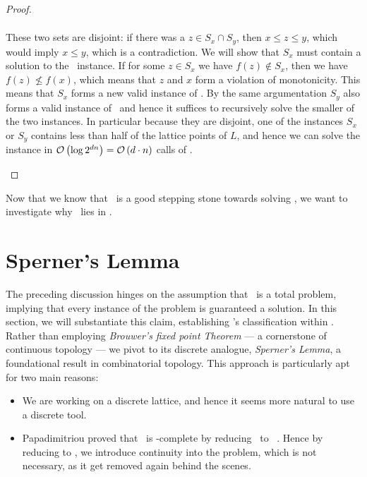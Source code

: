 \begin{proof}
\begin{case}{3}
\begin{align*}
        \end{align*}
        These two sets are disjoint: if there was a $z \in S_x \cap S_y$, then $x \leq z \leq y$, which would imply $x \leq y$, which is a contradiction. We will show that $S_x$ must contain a solution to the \Tarski\ instance.
        If for some $z \in S_x$ we have $f(z) \not\in S_x$, then we have $f(z) \not\leq f(x)$, which means that $z$ and $x$ form a violation of monotonicity. This means that $S_x$ forms a new valid instance of \Tarski. By the same argumentation $S_y$ also forms a valid instance of \Tarski\ and hence it suffices to recursively solve the smaller of the two instances. In particular because they are disjoint, one of the instances $S_x$ or $S_y$ contains less than half of the lattice points of $L$, and hence we can solve the instance in $\mathcal{O}\left(\log{2^{dn}}\right) = \mathcal{O}\left(d \cdot n\right)$ calls of \Tarskistar.
    \end{case}
\end{proof}

Now that we know that \Tarskistar\ is a good stepping stone towards solving \Tarski, we want to investigate why \Tarskistar\ lies in \PPAD.

\section{Sperner's Lemma}

The preceding discussion hinges on the assumption that \Tarskistar\ is a total problem, implying that every instance of the problem is guaranteed a solution. In this section, we will substantiate this claim, establishing \Tarskistar's classification within \TFNP. Rather than employing \textit{Brouwer's fixed point Theorem} --- a cornerstone of continuous topology --- we pivot to its discrete analogue, \textit{Sperner’s Lemma}, a foundational result in combinatorial topology. This approach is particularly apt for two main reasons:
\begin{itemize}
    \item We are working on a discrete lattice, and hence it seems more natural to use a discrete tool.
    \item Papadimitriou proved that \Brouwer\ is \PPAD-complete by reducing \Brouwer\ to \Sperner\ . Hence by reducing to \Brouwer, we introduce continuity into the problem, which is not necessary, as it get removed again behind the scenes.
\end{itemize}


